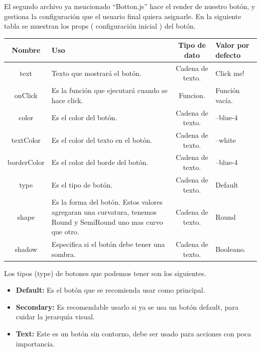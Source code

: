 El segundo archivo ya mencionado “Botton.js”  hace el render de nuestro botón, y gestiona la configuración que el usuario final quiera asignarle.
En la siguiente tabla se muestran los props ( configuración inicial  ) del botón.
\newline
\newline
\begin{center}
 \begin{tabular}{ | c |  p{5cm}  | c | p{3cm} |} 
 \hline
 \textbf{Nombre} &  \textbf{Uso} &  \textbf{ Tipo de dato} &  \textbf{Valor por defecto}\\ [0.5ex] 
 \hline\hline
text & Texto que mostrará el botón.  &  Cadena de texto. & Click me! \\  [2.5ex] 
 \hline
onClick & Es la función que ejecutará cuando se hace click. & Funcion. & Función vacía. \\[2.5ex] 
 \hline
color &  Es el color del botón. & Cadena de texto. & --blue-4 \\[3.5ex] 
 \hline
 textColor & Es el color del texto en el botón. &  Cadena de texto. & --white \\[2.5ex] 
 \hline
borderColor & Es el color del borde del botón. & Cadena de texto. & --blue-4 \\ [2.5ex] 
 \hline
 type & Es el tipo de botón. & Cadena de texto. & Default \\ [2.5ex] 
 \hline
 shape & Es la forma del botón. Estos valores agregaran una curvatura, tenemos Round y SemiRound uno mas curvo que otro. & Cadena de texto. & Round \\ [2.5ex] 
 \hline
 shadow & Especifica si el botón debe tener una sombra. & Cadena de texto. & Booleano. \\ [2.5ex] 
 \hline
\end{tabular}
\end{center}
\newline
\newline
\newline
Los tipos (type) de botones que podemos tener son los siguientes.
\begin{itemize}
\item \textbf{Default:} Es el botón que se recomienda usar como principal.
\item \textbf{Secondary:} Es recomendable usarlo si ya se usa un botón default, para cuidar la jerarquía visual.
\item \textbf{Text:} Este es un botón sin contorno, debe ser usado para acciones con poca importancia.
\end{itemize}
